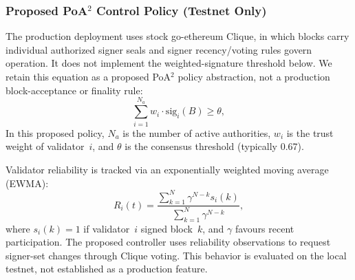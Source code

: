 \documentclass[conference]{IEEEtran}
\newcommand{\rev}[2]{#2}
\begin{document}
\begin{table}[!t]
\centering
\caption{Live PureChain validator set queried at
  block~1{,}012{,}544.}
\label{tab:validators}
\end{table}

\subsubsection{\rev{R1.2, R1.3, R2.4}{Proposed PoA$^2$ Control Policy (Testnet Only)}}

\rev{R1.2, R1.3, R2.4}{The production deployment uses stock
go-ethereum Clique, in which blocks carry individual authorized
signer seals and signer recency/voting rules govern operation.
It does not implement the weighted-signature threshold below.
We retain this equation as a proposed PoA$^2$ policy abstraction,
not a production block-acceptance or finality rule:}
\begin{equation}
\label{poa}
\sum_{i=1}^{N_a} w_i \cdot \mathrm{sig}_i(B) \ge \theta,
\end{equation}
\rev{R2.4}{In this proposed policy,} $N_a$ is the number of active authorities,
$w_i$ is the trust weight of validator~$i$, and $\theta$
is the consensus threshold (typically 0.67).

Validator reliability is tracked via an exponentially
weighted moving average (EWMA):
\begin{equation}
\label{validator}
R_i(t) =
\frac{\sum_{k=1}^{N}\gamma^{N-k}s_i(k)}
     {\sum_{k=1}^{N}\gamma^{N-k}},
\end{equation}
where $s_i(k)=1$ if validator~$i$ signed block~$k$,
and $\gamma$ favours recent participation.
\rev{R1.3, R2.4}{The proposed controller uses reliability observations to request signer-set changes through Clique voting. This behavior is evaluated on the local testnet, not established as a production feature.}
\end{document}
